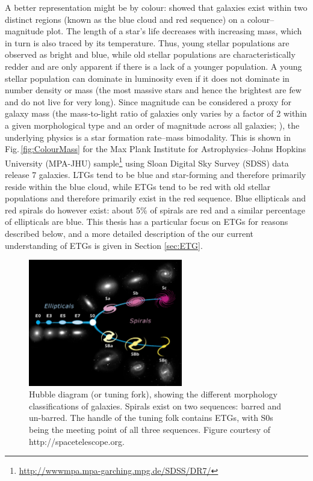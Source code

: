	A better representation might be by colour: \citet{Baldry2004} showed that galaxies exist within two distinct regions (known as the blue cloud and red sequence) on a colour--magnitude plot. The length of a star's life decreases with increasing mass, which in turn is also traced by its temperature. Thus, young stellar populations are observed as bright and blue, while old stellar populations are characteristically redder and are only apparent if there is a lack of a younger population. A young stellar population can dominate in luminosity even if it does not dominate in number density or mass (the most massive stars and hence the brightest are few and do not live for very long). Since magnitude can be considered a proxy for galaxy mass (the mass-to-light ratio of galaxies only varies by a factor of 2 within a given morphological type and an order of magnitude across all galaxies; \citealt{Faber1979}), the underlying physics is a star formation rate--mass bimodality. This is shown in Fig.\,\ref{fig:ColourMass} for the Max Plank Institute for Astrophysics--Johns Hopkins University (MPA-JHU) sample\footnote{\url{http://wwwmpa.mpa-garching.mpg.de/SDSS/DR7/}} using Sloan Digital Sky Survey (SDSS) data release 7 galaxies. LTGs tend to be blue and star-forming and therefore primarily reside within the blue cloud, while ETGs tend to be red with old stellar populations and therefore primarily exist in the red sequence. Blue ellipticals and red spirals do however exist: about 5\% of spirals are red \citep{Masters2010} and a similar percentage of ellipticals are blue\citep{Schawinski2009}. This thesis has a particular focus on ETGs for reasons described below, and a more detailed description of the our current understanding of ETGs is given in Section \ref{sec:ETG}. 

	\begin{figure}
		\centering
		\includegraphics[width=0.6\textwidth]{introduction/hubble.jpg}
		\caption[The Hubble tuning-fork]{Hubble diagram (or tuning fork), showing the different morphology classifications of galaxies. Spirals exist on two sequences: barred and un-barred. The handle of the tuning folk contains ETGs, with S0s being the meeting point of all three sequences. Figure courtesy of http://spacetelescope.org.}
		\label{fig:Hubble}
	\end{figure}

